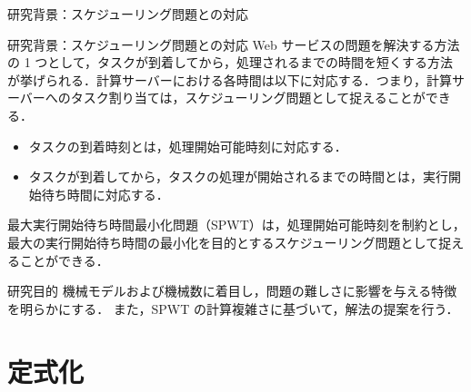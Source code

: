 \documentclass[dvipdfmx]{beamer}
\begin{document}
\begin{frame}{研究背景：スケジューリング問題との対応}
  \begin{block}{研究背景：スケジューリング問題との対応}
    Web サービスの問題を解決する方法の 1 つとして，\alert{タスクが到着してから，処理されるまでの時間を短くする}方法が挙げられる．計算サーバーにおける各時間は以下に対応する．つまり，計算サーバーへのタスク割り当ては，スケジューリング問題として捉えることができる．
    \begin{itemize}
      \item タスクの到着時刻とは，\alert{処理開始可能時刻}に対応する．
      \item タスクが到着してから，タスクの処理が開始されるまでの時間とは，\alert{実行開始待ち時間}に対応する．
    \end{itemize}
    \alert{最大実行開始待ち時間最小化問題（SPWT）}は，処理開始可能時刻を制約とし，最大の実行開始待ち時間の最小化を目的とするスケジューリング問題として捉えることができる．
  \end{block}

  \begin{block}{研究目的}
    機械モデルおよび機械数に着目し，問題の難しさに影響を与える特徴を明らかにする．
    また，SPWT の計算複雑さに基づいて，解法の提案を行う．
  \end{block}

\end{frame}
%
%
\section{定式化}
\end{document}
